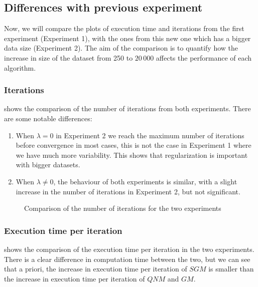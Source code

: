 \pagebreak
\subsection{Differences with previous experiment}

Now, we will compare the plots of execution time and iterations
from the first experiment (Experiment 1), with
the ones from this new one which has a bigger data size (Experiment 2). The aim of the comparison
is to quantify how the increase in size of the dataset
from 250 to $20\,000$ affects the performance of each algorithm.

\subsubsection{Iterations}

 shows the comparison of the number
of iterations from both experiments. There are some notable differences:
\begin{enumerate}
    \item When $\lambda = 0$ in Experiment 2 we reach the maximum number of iterations
        before convergence in most cases, this is not the case in Experiment 1 where
        we have much more variability. This shows that regularization is important
        with bigger datasets.
    \item When $\lambda \neq 0$, the behaviour of both experiments is similar, with
        a slight increase in the number of iterations in Experiment 2, but not
        significant.
\end{enumerate}

\begin{figure}[H]
    
    \caption{Comparison of the number of iterations for the two experiments}
    \label{fig:comp_niter}
\end{figure}

\pagebreak
\subsubsection{Execution time per iteration}

 shows the comparison of the execution time per iteration in the
two experiments. There is a clear difference in computation time between the two, but
we can see that a priori, the increase in execution time per iteration of
$SGM$ is smaller than the increase in execution time per iteration of $QNM$ and $GM$.

